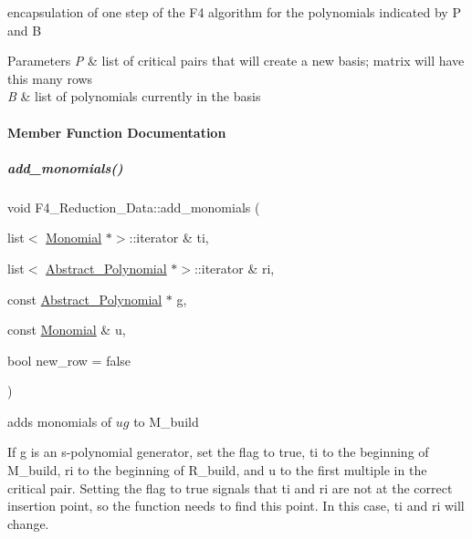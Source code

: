 encapsulation of one step of the F4 algorithm for the polynomials indicated by {\ttfamily P} and {\ttfamily B} 


\begin{DoxyParams}{Parameters}
{\em P} & list of critical pairs that will create a new basis; matrix will have this many rows \\
\hline
{\em B} & list of polynomials currently in the basis \\
\hline
\end{DoxyParams}


\paragraph{Member Function Documentation}
\mbox{\label{group___g_b_computation_ad241aa62afb6b6e0b482496c7559f092}} 
\subparagraph{\texorpdfstring{add\+\_\+monomials()}{add\_monomials()}\hspace{0.1cm}{\footnotesize\ttfamily [1/2]}}
{\footnotesize\ttfamily void F4\+\_\+\+Reduction\+\_\+\+Data\+::add\+\_\+monomials (\begin{DoxyParamCaption}\item[{list$<$ \hyperlink{group__polygroup_class_monomial}{Monomial} $\ast$$>$\+::iterator \&}]{ti,  }\item[{list$<$ \hyperlink{group__polygroup_class_abstract___polynomial}{Abstract\+\_\+\+Polynomial} $\ast$$>$\+::iterator \&}]{ri,  }\item[{const \hyperlink{group__polygroup_class_abstract___polynomial}{Abstract\+\_\+\+Polynomial} $\ast$}]{g,  }\item[{const \hyperlink{group__polygroup_class_monomial}{Monomial} \&}]{u,  }\item[{bool}]{new\+\_\+row = {\ttfamily false} }\end{DoxyParamCaption})}



adds monomials of $ ug $ to {\ttfamily M\+\_\+build} 

If {\ttfamily g} is an s-\/polynomial generator, set the flag to {\ttfamily true}, {\ttfamily ti} to the beginning of {\ttfamily M\+\_\+build}, {\ttfamily ri} to the beginning of {\ttfamily R\+\_\+build}, and {\ttfamily u} to the first multiple in the critical pair. Setting the flag to {\ttfamily true} signals that {\ttfamily ti} and {\ttfamily ri} are not at the correct insertion point, so the function needs to find this point. In this case, {\ttfamily ti} and {\ttfamily ri} will change.

